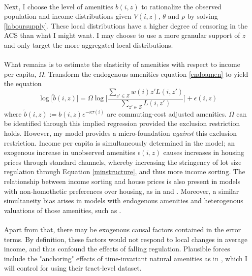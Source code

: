\documentclass[]{article}
\begin{document}
\paragraph*{}
Next, I choose the level of amenities $b(i, z)$ to rationalize the observed population and income distributions given $V(i, z)$, $\theta$ and $\rho$ by solving \eqref{laboursupply}. These local distributions have a higher degree of censoring in the ACS than what I might want. I may choose to use a more granular support of $z$ and only target the more aggregated local distributions.

\paragraph*{}
 What remains is to estimate the elasticity of amenities with respect to income per capita, $\Omega$. Transform the endogenous amenities equation \eqref{endoamen} to yield the equation 
 \begin{equation}
 	\log\big[\tilde{b}(i, z)\big] = \Omega\log\bigg[\frac{\sum_{z' \in Z}w(i)z'L(i, z')}{\sum_{z' \in Z}L(i, z')}\bigg] + \epsilon(i, z)
 \end{equation}
 where $\tilde{b}(i, z) := b(i, z)e^{-\kappa\tau(i)}$ are commuting-cost adjusted amenities.  $\Omega$ can be identified through this implied regression provided the exclusion restriction holds. However, my model provides a micro-foundation \textit{against} this exclusion restriction. Income per capita is simultaneously determined in the model; an exogenous increase in unobserved amenities $\epsilon(i, z)$ causes increases in housing prices through standard channels, whereby increasing the stringency of lot size regulation through Equation \eqref{minstructure}, and thus more income sorting. The relationship between income sorting and house prices is also present in models with non-homothetic preferences over housing, as in \cite{superstarcities} and \cite{LeeandLin}. Moreover, a similar simultaneity bias arises in models with endogenous amenities and heterogenous valuations of those amenities, such as \cite{diamond2016}. 
 \paragraph{}
 Apart from that, there may be exogenous causal factors contained in the error terms. By definition, these factors would not respond to local changes in average income, and thus confound the effects of falling regulation. Plausible forces include the "anchoring" effects of time-invariant natural amenities as in \cite{LeeandLin}, which I will control for using their tract-level dataset. 
 
\end{document}

